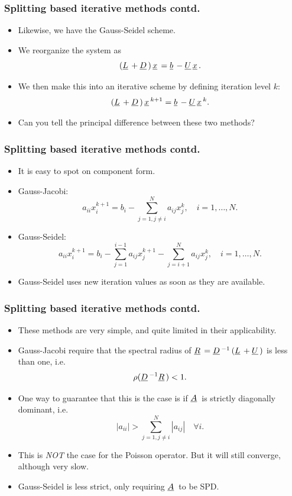 \documentclass{beamer}
\newcommand{\ub}[1]{\underbar{$#1$}\,}
\begin{document}
\begin{frame}\frametitle{Splitting based iterative methods contd.}
  \begin{itemize}
    \item Likewise, we have the Gauss-Seidel scheme.
    \item We reorganize the system as
      \[
        \left(\ub{L}+\ub{D}\right)\ub{x} = \ub{b}-\ub{U}\ub{x}.
      \]
    \item We then make this into an iterative scheme by defining iteration level $k$:
      \[
        \left(\ub{L}+\ub{D}\right)\ub{x}^{k+1} = \ub{b}-\ub{U}\ub{x}^{k}.
      \]
    \item Can you tell the principal difference between these two methods?
  \end{itemize}
\end{frame}
\begin{frame}\frametitle{Splitting based iterative methods contd.}
  \begin{itemize}
    \item It is easy to spot on component form.
    \item Gauss-Jacobi:
      \[
        a_{ii}x_i^{k+1} = b_i - \sum_{j=1, j\neq i}^{N} a_{ij}x_j^k, \quad i=1,\dots,N.
      \]
    \item Gauss-Seidel:
      \[
        a_{ii}x_i^{k+1} = b_i - \sum_{j=1}^{i-1} a_{ij}x_j^{k+1} - \sum_{j=i+1}^Na_{ij}x_j^k, \quad i=1,\dots,N.
      \]
    \item Gauss-Seidel uses new iteration values as soon as they are available.
  \end{itemize}
\end{frame}
\begin{frame}\frametitle{Splitting based iterative methods contd.}
  \begin{itemize}
    \item These methods are very simple, and quite limited in their applicability.
    \item Gauss-Jacobi require that the spectral radius of $\ub{R} = \ub{D}^{-1}\left(\ub{L}+\ub{U}\right)$ is less than one, i.e.
      \[
        \rho(\ub{D}^{-1}\ub{R}) < 1.
      \]
    \item One way to guarantee that this is the case is if $\ub{A}$ is strictly diagonally dominant, i.e.
      \[
        |a_{ii}| > \sum_{j=1,j\neq i}^N |a_{ij}| \quad \forall i.
      \]
    \item This is \emph{NOT} the case for the Poisson operator. But it will still converge, although very slow.
    \item Gauss-Seidel is less strict, only requiring $\ub{A}$ to be SPD.
  \end{itemize}
\end{frame}
\end{document}
